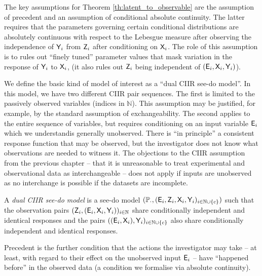 The key assumptions for Theorem \ref{th:latent_to_observable} are the assumption of precedent and an assumption of conditional absolute continuity. The latter requires that the parameters governing certain conditional distributions are absolutely continuous with respect to the Lebesgue measure after observing the independence of $\mathsf{Y}_i$ from $\mathsf{Z}_i$ after conditioning on $\mathsf{X}_i$. The role of this assumption is to rules out ``finely tuned'' parameter values that mask variation in the response of $\mathsf{Y}_i$ to $\mathsf{X}_i$, (it also rules out $\mathsf{Z}_i$ being independent of $(\mathsf{E}_i,\mathsf{X}_i,\mathsf{Y}_i)$).

We define the basic kind of model of interest as a ``dual CIIR see-do model''. In this model, we have two different CIIR pair sequences. The first is limited to the passively observed variables (indices in $\mathbb{N}$). This assumption may be justified, for example, by the standard assumption of exchangeability. The second applies to the entire sequence of variables, but requires conditioning on an input variable $\mathsf{E}_i$ which we understandis generally unobserved. There is ``in principle'' a consistent response function that may be observed, but the investigator does not know what observations are needed to witness it. The objections to the CIIR assumption from the previous chapter -- that it is unreasonable to treat experimental and observational data as interchangeable -- does not apply if inputs are unobserved as no interchange is possible if the datasets are incomplete.

\begin{definition}\label{def:lciirm}
A \emph{dual CIIR see-do model} is a see-do model $(\mathbb{P}_\cdot,(\mathsf{E}_i,\mathsf{Z}_{i},\mathsf{X}_i,\mathsf{Y}_i)_{i\in \mathbb{N}\cup\{c\}})$ such that the observation pairs $(\mathsf{Z}_{i},(\mathsf{E}_i,\mathsf{X}_i,\mathsf{Y}_i))_{i\in \mathbb{N}}$ share conditionally independent and identical responses and the pairs $((\mathsf{E}_i, \mathsf{X}_i),\mathsf{Y}_i)_{i\in\mathbb{N}\cup\{c\}}$ also share conditionally independent and identical responses.
\end{definition}

Precedent is the further condition that the actions the investigator may take -- at least, with regard to their effect on the unobserved input $\mathsf{E}_i$ -- have ``happened before'' in the observed data (a condition we formalise via absolute continuity).

